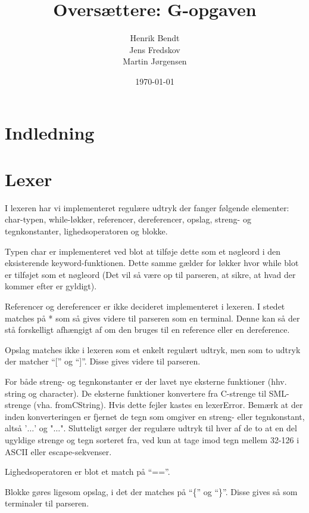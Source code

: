 \documentclass[a2paper, 10pt]{article}
\author{Henrik Bendt \\ Jens Fredskov \\ Martin Jørgensen}
\title{Oversættere: G-opgaven}
\date{\today}
\begin{document}
\maketitle
\pagebreak

\section{Indledning}

\section{Lexer}
I lexeren har vi implementeret regulære udtryk der fanger følgende elementer:
char-typen, while-løkker, referencer, dereferencer, opslag, streng- og tegnkonstanter,
lighedsoperatoren og blokke.

Typen char er implementeret ved blot at tilføje dette som et nøgleord i den
eksisterende keyword-funktionen. Dette samme gælder for løkker hvor while blot
er tilføjet som et nøgleord (Det vil så være op til parseren, at sikre, at hvad
der kommer efter er gyldigt).

Referencer og dereferencer er ikke decideret implementeret i lexeren. I stedet
matches på * som så gives videre til parseren som en terminal. Denne kan så
der stå forskelligt afhængigt af om den bruges til en reference eller en
dereference.

Opslag matches ikke i lexeren som et enkelt regulært udtryk, men som to udtryk
der matcher ``['' og ``]''. Disse gives videre til parseren.

For både streng- og tegnkonstanter er der lavet nye eksterne funktioner (hhv.
string og character). De eksterne funktioner konvertere fra C-strenge til
SML-strenge (vha. fromCString). Hvis dette fejler kastes en lexerError. Bemærk
at der inden konverteringen er fjernet de tegn som omgiver en streng- eller
tegnkonstant, altså '$\ldots$' og "$\ldots$". Slutteligt sørger der
regulære udtryk til hver af de to at en del ugyldige strenge og tegn sorteret
fra, ved kun at tage imod tegn mellem 32-126 i ASCII eller escape-sekvenser.

Lighedsoperatoren er blot et match på ``==''.

Blokke gøres ligesom opslag, i det der matches på ``\{'' og ``\}''. Disse gives
så som terminaler til parseren.
\end{document}
